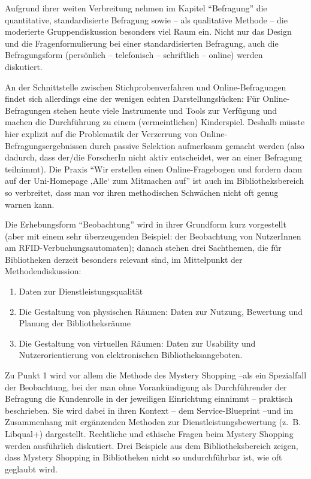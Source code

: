 \documentclass[a4paper,
fontsize=11pt,
oneside,
numbers=noperiodatend,
parskip=half-,
bibliography=totoc,
final
]{scrartcl}
\begin{document}
Aufgrund ihrer weiten Verbreitung nehmen im Kapitel \enquote{Befragung}
die quantitative, standardisierte Befragung sowie -- als qualitative
Methode -- die moderierte Gruppendiskussion besonders viel Raum ein.
Nicht nur das Design und die Fragenformulierung bei einer
standardisierten Befragung, auch die Befragungsform (persönlich --
telefonisch -- schriftlich -- online) werden diskutiert.~

An der Schnittstelle zwischen Stichprobenverfahren und
Online-Befragungen findet sich allerdings eine der wenigen echten
Darstellungslücken: Für Online-Befragungen stehen heute viele
Instrumente und Tools zur Verfügung und machen die Durchführung zu einem
(vermeintlichen) Kinderspiel. Deshalb müsste hier explizit auf die
Problematik der Verzerrung von Online-Befragungsergebnissen durch
passive Selektion aufmerksam gemacht werden (also dadurch, dass der/die
ForscherIn nicht aktiv entscheidet, wer an einer Befragung teilnimmt).
Die Praxis \enquote{Wir erstellen einen Online-Fragebogen und fordern
dann auf der Uni-Homepage ‚Alle` zum Mitmachen auf} ist auch im
Bibliotheksbereich so verbreitet, dass man vor ihren methodischen
Schwächen nicht oft genug warnen kann.

Die Erhebungsform \enquote{Beobachtung} wird in ihrer Grundform kurz
vorgestellt (aber mit einem sehr überzeugenden Beispiel: der Beobachtung
von NutzerInnen am RFID-Verbuchungsauto\-maten); danach stehen drei
Sachthemen, die für Bibliotheken derzeit besonders relevant sind, im
Mittelpunkt der Methodendiskussion:~

\begin{enumerate}
\def\labelenumi{\arabic{enumi}.}
\item
  Daten zur Dienstleistungsqualität
\item
  Die Gestaltung von physischen Räumen: Daten zur Nutzung, Bewertung und
  Planung der Bibliotheksräume
\item
  Die Gestaltung von virtuellen Räumen: Daten zur Usability und
  Nutzerorientierung von elektronischen Bibliotheksangeboten.
\end{enumerate}

Zu Punkt 1 wird vor allem die Methode des Mystery Shopping --als ein
Spezialfall der Beobachtung, bei der man ohne Vorankündigung als
Durchführender der Befragung die Kundenrolle in der jeweiligen
Einrichtung einnimmt -- praktisch beschrieben. Sie wird dabei in ihren
Kontext -- dem Service-Blueprint --und im Zusammenhang mit ergänzenden
Methoden zur Dienstleistungsbewertung (z.~B. Libqual+) dargestellt.
Rechtliche und ethische Fragen beim Mystery Shopping werden ausführlich
diskutiert. Drei Beispiele aus dem Bibliotheksbereich zeigen, dass
Mystery Shopping in Bibliotheken nicht so undurchführbar ist, wie oft
geglaubt wird.
\end{document}
